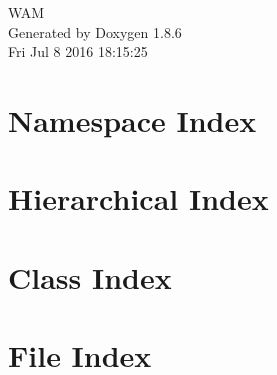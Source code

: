 \documentclass[twoside]{book}
\newcommand{\clearemptydoublepage}{%
  \newpage{\pagestyle{empty}\cleardoublepage}%
}
\begin{document}
\hypersetup{pageanchor=false}
\begin{titlepage}
\vspace*{7cm}
\begin{center}%
{\Large W\-A\-M }\\
\vspace*{1cm}
{\large Generated by Doxygen 1.8.6}\\
\vspace*{0.5cm}
{\small Fri Jul 8 2016 18:15:25}\\
\end{center}
\end{titlepage}
\clearemptydoublepage
\tableofcontents
\clearemptydoublepage
{}
\hypersetup{pageanchor=true}

\chapter{Namespace Index}

\chapter{Hierarchical Index}

\chapter{Class Index}

\chapter{File Index}

\end{document}
